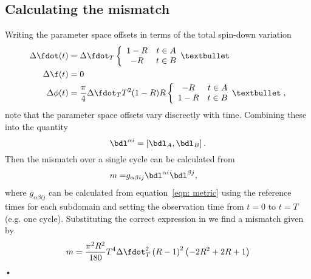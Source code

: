 
\subsection{Calculating the mismatch}
Writing the parameter space offsets in terms of the total spin-down variation
\begin{align}
\Delta\fdot(t) &= \dST\two{1-R}{-R} \\
\Delta\f(t) &= 0  \\
\Delta\phi(t) & = \frac{\pi}{4} \dST T^{2}(1-R)R \two{-R}{1-R},
\label{eqn: Lyne parameter space offsets}
\end{align}
note that the parameter space offsets vary discreetly with time. Combining
these into the quantity 
\begin{equation}
\bdl^{\alpha i} = \left[\bdl_{A}, \bdl_{B}\right].
\end{equation}
Then the mismatch over a single cycle can be calculated from
\begin{align}
m = & g_{\alpha\beta ij}\bdl^{\alpha i} \bdl^{\beta j},
\end{align}
where $g_{\alpha\beta i j}$ can be calculated from equation~\eqref{eqn: metric}
using the reference times for each subdomain and setting the observation time
from $t=0$ to $t=T$ (e.g. one cycle). Substituting the correct expression in we find a mismatch given by
\begin{equation}
m = \frac{\pi^{2} R^{2}}{180} T^{4} \dST^{2} \left(R - 1\right)^{2} 
    \left(-2 R^{2} + 2 R + 1\right)
\label{eqn: mismatch lyne single switch}
\end{equation}•

